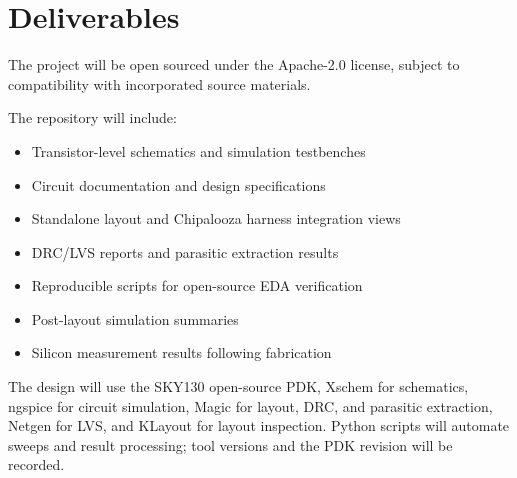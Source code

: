 
\section{Deliverables}

The project will be open sourced under the Apache-2.0 license, subject to compatibility with incorporated source materials.

The repository will include:

\begin{itemize}
    \item Transistor-level schematics and simulation testbenches

    \item Circuit documentation and design specifications

    \item Standalone layout and Chipalooza harness integration views

    \item DRC/LVS reports and parasitic extraction results

    \item Reproducible scripts for open-source EDA verification

    \item Post-layout simulation summaries

    \item Silicon measurement results following fabrication
\end{itemize}

The design will use the SKY130 open-source PDK, Xschem for schematics, ngspice for circuit simulation, Magic for layout, DRC, and parasitic extraction, Netgen for LVS, and KLayout for layout inspection.
Python scripts will automate sweeps and result processing; tool versions and the PDK revision will be recorded.

